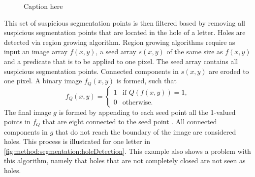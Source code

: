 	\begin{figure}
		\centering
		\caption{Caption here}
		\label{fig:method:segmentation:suspiciousSegmentationPoints}
	\end{figure}

	This set of suspicious segmentation points is then filtered based by removing all suspicious segmentation points that are located in the hole of a letter. Holes are detected via region growing algorithm. Region growing algorithms require as input an image array $f(x,y)$, a seed array $s(x,y)$ of the same size as $f(x,y)$ and a predicate that is to be applied to one pixel. The seed array contains all suspicious segmentation points. Connected components in $s(x,y)$ are eroded to one pixel. A binary image $f_Q(x,y)$ is formed, such that
	\begin{equation*}
		f_Q(x,y) = 
		\begin{cases}
			1 & \text{if }Q(f(x,y)) = 1,\\
			0 & \text{otherwise.}
		\end{cases}
	\end{equation*}
	The final image $g$ is formed by appending to each seed point all the 1-valued points in $f_Q$ that are eight connected to the seed point \cite{gonzalez2002digitalCh10}. All connected components in $g$ that do not reach the boundary of the image are considered holes. This process is illustrated for one letter in \cref{fig:method:segmentation:holeDetection}. This example also shows a problem with this algorithm, namely that holes that are not completely closed are not seen as holes. 

